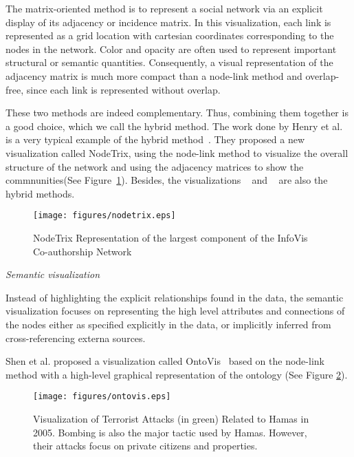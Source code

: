 The matrix-oriented method is to represent a social network via an
explicit display of its adjacency or incidence matrix. In this
visualization, each link is represented as a grid location with
cartesian coordinates corresponding to the nodes in the
network. Color and opacity are often used to represent important
structural or semantic quantities. Consequently, a visual
representation of the adjacency matrix is much more compact than a
node-link method and overlap-free, since each link is represented
without overlap.

These two methods are indeed complementary. Thus, combining them
together is a good choice, which we call the hybrid method. The work done by Henry et al. is a very
typical example of the hybrid method~\cite{henry2007nodetrix}. They
proposed a new visualization called NodeTrix, using the node-link
method to visualize the overall structure of the network and using the
adjacency matrices to show the commnunities(See Figure~\ref{fig:nodetrix}).
Besides, the visualizations ~\cite{shen2007path} and
~\cite{muelder2008rapid} are also the hybrid methods.

\begin{figure}[!htb]
  \centering
  \texttt{[image: figures/nodetrix.eps]}
  \caption{NodeTrix Representation of the largest component of the InfoVis Co-authorship Network ~\cite{henry2007nodetrix}}
  \label{fig:nodetrix}
\end{figure}

\textit{Semantic visualization}

Instead of highlighting the explicit relationships found in the data,
the semantic visualization focuses on representing the high level
attributes and connections of the nodes either as specified
explicitly in the data, or implicitly inferred from cross-referencing
externa sources.

Shen et al. proposed a visualization called OntoVis~\cite{shen2006visual} based on the
node-link method with a high-level graphical representation of the
ontology (See Figure \ref{fig:ontovis}).

\begin{figure}[!htb]
  \centering
  \texttt{[image: figures/ontovis.eps]}
  \caption{Visualization of Terrorist Attacks (in green) Related to Hamas in 2005. Bombing is also the major tactic used by Hamas. However, their attacks focus on private citizens and properties. ~\cite{shen2006visual}}
  \label{fig:ontovis}
\end{figure}


